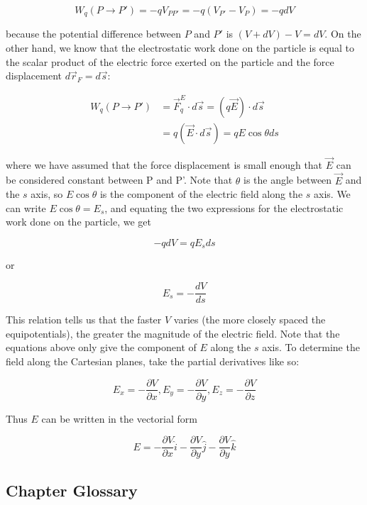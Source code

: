        \[
            W_q (P\to P') = -q V_{PP'} = -q(V_{P'}-V_P) = -q dV
        \]

        because the potential difference between $P$ and $P'$ is $(V + dV) - V = dV$. On the other hand, we know that the electrostatic work done on the particle is equal to the scalar product of the electric force
        exerted on the particle and the force displacement $d\vec{r}_F = d\vec{s}$:

        \begin{align*}
            W_q (P\to P')   &= \vec{F}^E_q \cdot d\vec{s} = (q\vec{E})\cdot d\vec{s} \\
                            &= q(\vec{E}\cdot d\vec{s}) = qE\cos{\theta}ds
        \end{align*}

        where we have assumed that the force displacement is small enough that $\vec{E}$ can be considered constant between P and P'. Note that $\theta$ is the angle between $\vec{E}$ and the $s$ axis, so $E\cos{\theta}$
        is the component of the electric field along the $s$ axis. We can write $E\cos{\theta} = E_s$, and equating the two expressions for the electrostatic work done on the particle, we get

        \[
            -q dV = qE_s ds
        \]

        or

        \[
            E_s = -\frac{dV}{ds}
        \]

        This relation tells us that the faster $V$ varies (the more closely spaced the equipotentials), the greater the magnitude of the electric field. Note that the equations above only give the component of $E$ along
        the $s$ axis. To determine the field along the Cartesian planes, take the partial derivatives like so:

        \[
            E_x = -\frac{\partial V}{\partial x}, E_y = -\frac{\partial V}{\partial y}, E_z = -\frac{\partial V}{\partial z}
        \]

        Thus $E$ can be written in the vectorial form

        \[
            E = -\frac{\partial V}{\partial x}\hat{i} - \frac{\partial V}{\partial y}\hat{j} - \frac{\partial V}{\partial y} \hat{k}
        \]

    \subsection{Chapter Glossary}


